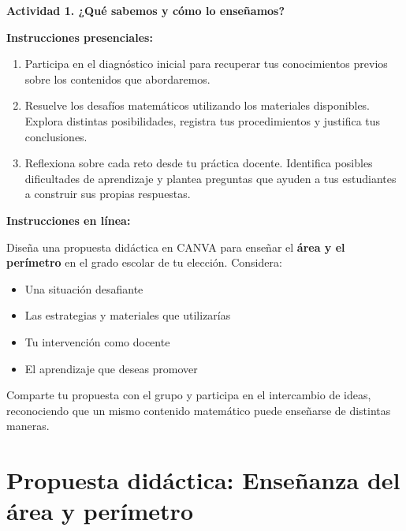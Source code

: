 \documentclass[spanish,letterpaper,oneside]{article}
\begin{document}
\begin{consignabox}
\textbf{Actividad 1. ¿Qué sabemos y cómo lo enseñamos?}

\vspace{0.3cm}

\textbf{Instrucciones presenciales:}
\begin{enumerate}
  \item Participa en el diagnóstico inicial para recuperar tus conocimientos previos sobre los contenidos que abordaremos.
  \item Resuelve los desafíos matemáticos utilizando los materiales disponibles. Explora distintas posibilidades, registra tus procedimientos y justifica tus conclusiones.
  \item Reflexiona sobre cada reto desde tu práctica docente. Identifica posibles dificultades de aprendizaje y plantea preguntas que ayuden a tus estudiantes a construir sus propias respuestas.
\end{enumerate}

\textbf{Instrucciones en línea:}

Diseña una propuesta didáctica en CANVA para enseñar el \textbf{área y el perímetro} en el grado escolar de tu elección. Considera:
\begin{itemize}
  \item Una situación desafiante
  \item Las estrategias y materiales que utilizarías
  \item Tu intervención como docente
  \item El aprendizaje que deseas promover
\end{itemize}

Comparte tu propuesta con el grupo y participa en el intercambio de ideas, reconociendo que un mismo contenido matemático puede enseñarse de distintas maneras.
\end{consignabox}

\section{Propuesta didáctica: Enseñanza del área y perímetro}
\end{document}
